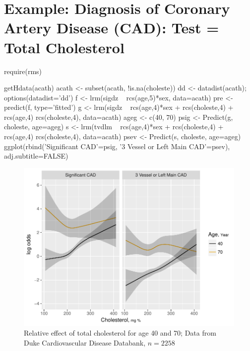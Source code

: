\section{Example: Diagnosis of Coronary Artery Disease (CAD): Test = Total
Cholesterol}
\begin{Schunk}
\begin{Sinput}
require(rms)
\end{Sinput}
\begin{Sinput}
getHdata(acath)
acath <- subset(acath, !is.na(choleste))
dd <- datadist(acath);  options(datadist='dd')
f <- lrm(sigdz ~ rcs(age,5)*sex, data=acath)
pre <- predict(f, type='fitted')
g <- lrm(sigdz ~ rcs(age,4)*sex + rcs(choleste,4) + rcs(age,4) %
         rcs(choleste,4), data=acath)
ageg <- c(40, 70)
psig <- Predict(g, choleste, age=ageg)
s <- lrm(tvdlm ~ rcs(age,4)*sex + rcs(choleste,4) + rcs(age,4) %
	rcs(choleste,4), data=acath)
psev <- Predict(s, choleste, age=ageg)
ggplot(rbind('Significant CAD'=psig, '3 Vessel or Left Main CAD'=psev),
	adj.subtitle=FALSE)
\end{Sinput}
\begin{figure}[htbp]

\centerline{\includegraphics{dx-du-1} }

\caption[Relative effect of total cholesterol for age 40 and 70]{Relative effect of total cholesterol for age 40 and 70; Data from Duke Cardiovascular Disease Databank, $n=2258$}\label{fig:dx-du}
\end{figure}
\end{Schunk}
\clearpage
